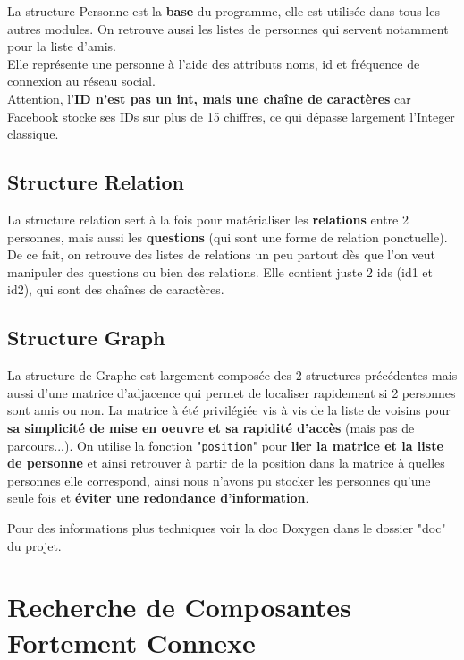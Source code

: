 \documentclass[a4paper, titlepage, oneside]{book}
\begin{document}
	La structure Personne est la \textbf{base} du programme, elle est utilisée dans tous les autres modules. On retrouve aussi les listes de personnes qui servent notamment pour la liste d'amis.\\
	Elle représente une personne à l'aide des attributs noms, id et fréquence de connexion au réseau social.\\
	Attention, l'\textbf{ID n'est pas un int, mais une chaîne de caractères} car Facebook stocke ses IDs sur plus de 15 chiffres, ce qui dépasse largement l'Integer classique.
	
\subsection{Structure Relation}
	
	La structure relation sert à la fois pour matérialiser les \textbf{relations} entre 2 personnes, mais aussi les \textbf{questions} (qui sont une forme de relation ponctuelle). De ce fait, on retrouve des listes de relations un peu partout dès que l'on veut manipuler des questions ou bien des relations. Elle contient juste 2 ids (id1 et id2), qui sont des chaînes de caractères.

\subsection{Structure Graph}
	
	La structure de Graphe est largement composée des 2 structures précédentes mais aussi d'une matrice d'adjacence qui permet de localiser rapidement si 2 personnes sont amis ou non. La matrice à été privilégiée vis à vis de la liste de voisins pour \textbf{sa simplicité de mise en oeuvre et sa rapidité d'accès} (mais pas de parcours...).
	On utilise la fonction "\texttt{position}" pour \textbf{lier la matrice et la liste de personne} et ainsi retrouver à partir de la position dans la matrice à quelles personnes elle correspond, ainsi nous n'avons pu stocker les personnes qu'une seule fois et \textbf{éviter une redondance d'information}.

Pour des informations plus techniques voir la doc Doxygen dans le dossier "doc" du projet.

\newpage

\section{Recherche de Composantes Fortement Connexe}
\end{document}
